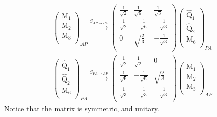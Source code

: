 \documentclass[12pt,a4paper]{article}
\newcounter{arrow}
\begin{document}
\begin{align}\left( \begin{matrix}
\text{M}_1\\
\text{M}_2\\
\text{M}_3\\
\end{matrix} \right)_{AP}
\xrightarrow{S_{AP \rightarrow PA}}
\left( \begin{matrix}
\frac{1}{\sqrt{2}} & \frac{1}{\sqrt{6}} &  \frac{1}{\sqrt{3}} \\
\frac{1}{\sqrt{2}} & - \frac{1}{\sqrt{6}} & -\frac{1}{\sqrt{3}} \\
0& \sqrt{\frac{2}{3}} & -\frac{1}{\sqrt{3}} \\
\end{matrix} \right)
\left( \begin{matrix}
\widehat{\text{Q}}_1\\
\widehat{\text{Q}}_2\\
\text{M}_6\\
\end{matrix} \right)_{PA}
\end{align}
\begin{align}
\left( \begin{matrix}
\widehat{\text{Q}}_1\\
\widehat{\text{Q}}_2\\
\text{M}_6\\
\end{matrix} \right)_{PA}
\xrightarrow{S_{PA \rightarrow AP}}
\left( \begin{matrix}
\frac{1}{\sqrt{2}}& \frac{1}{\sqrt{2}}& 0 \\
\frac{1}{\sqrt{6}} & - \frac{1}{\sqrt{6}} & \sqrt{\frac{2}{3}} \\
\frac{1}{\sqrt{3}} & - \frac{1}{\sqrt{3}} & - \frac{1}{\sqrt{3}} \\
\end{matrix} \right)
\left( \begin{matrix}
\text{M}_1\\
\text{M}_2\\
\text{M}_3\\
\end{matrix} \right)_{AP}
\end{align}
Notice that the matrix is symmetric, and unitary.
\end{document}
